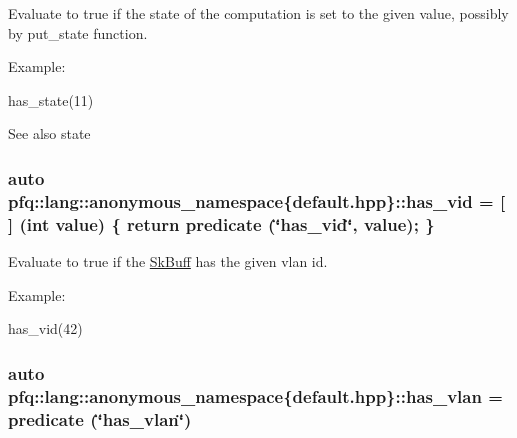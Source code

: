 Evaluate to {\ttfamily true} if the state of the computation is set to the given {\ttfamily value}, possibly by put\+\_\+state function. 

Example\+:

has\+\_\+state(11)

\begin{DoxySeeAlso}{See also}
state 
\end{DoxySeeAlso}
\subsubsection[{\texorpdfstring{has\+\_\+vid}{has_vid}}]{\setlength{\rightskip}{0pt plus 5cm}auto pfq\+::lang\+::anonymous\+\_\+namespace\{default.\+hpp\}\+::has\+\_\+vid = \mbox{[}$\,$\mbox{]} (int value) \{ return {\bf predicate} (\char`\"{}has\+\_\+vid\char`\"{}, value); \}}\hypertarget{namespacepfq_1_1lang_1_1anonymous__namespace_02default_8hpp_03_a99c204d8095fdccd50d4cb24d32e5b5b}{}\label{namespacepfq_1_1lang_1_1anonymous__namespace_02default_8hpp_03_a99c204d8095fdccd50d4cb24d32e5b5b}


Evaluate to {\ttfamily true} if the \hyperlink{structpfq_1_1lang_1_1SkBuff}{Sk\+Buff} has the given vlan id. 

Example\+:

has\+\_\+vid(42) 
\subsubsection[{\texorpdfstring{has\+\_\+vlan}{has_vlan}}]{\setlength{\rightskip}{0pt plus 5cm}auto pfq\+::lang\+::anonymous\+\_\+namespace\{default.\+hpp\}\+::has\+\_\+vlan = {\bf predicate} (\char`\"{}has\+\_\+vlan\char`\"{})}\hypertarget{namespacepfq_1_1lang_1_1anonymous__namespace_02default_8hpp_03_a1f0378ddfa90777d11ffae5fbb57b4e0}{}\label{namespacepfq_1_1lang_1_1anonymous__namespace_02default_8hpp_03_a1f0378ddfa90777d11ffae5fbb57b4e0}


